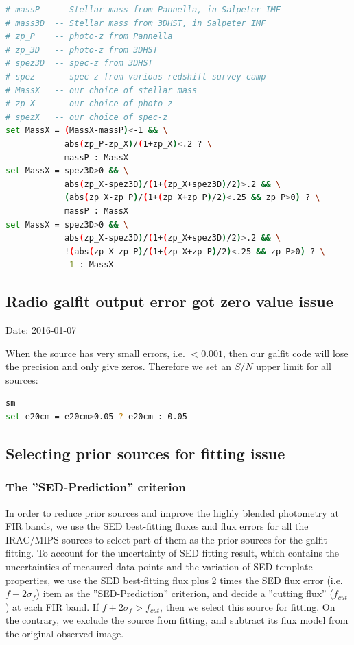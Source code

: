 \documentclass[11pt,a4paper]{article}
\begin{document}
\begin{lstlisting}[language=bash]
# massP   -- Stellar mass from Pannella, in Salpeter IMF
# mass3D  -- Stellar mass from 3DHST, in Salpeter IMF
# zp_P    -- photo-z from Pannella
# zp_3D   -- photo-z from 3DHST
# spez3D  -- spec-z from 3DHST
# spez    -- spec-z from various redshift survey camp
# MassX   -- our choice of stellar mass
# zp_X    -- our choice of photo-z
# spezX   -- our choice of spec-z
set MassX = (MassX-massP)<-1 && \
            abs(zp_P-zp_X)/(1+zp_X)<.2 ? \
            massP : MassX 
set MassX = spez3D>0 && \
            abs(zp_X-spez3D)/(1+(zp_X+spez3D)/2)>.2 && \
            (abs(zp_X-zp_P)/(1+(zp_X+zp_P)/2)<.25 && zp_P>0) ? \
            massP : MassX
set MassX = spez3D>0 && \
            abs(zp_X-spez3D)/(1+(zp_X+spez3D)/2)>.2 && \
            !(abs(zp_X-zp_P)/(1+(zp_X+zp_P)/2)<.25 && zp_P>0) ? \
            -1 : MassX
\end{lstlisting}


\subsection{Radio galfit output error got zero value issue}

\textcolor{green!90!black!60!orange}{Date: 2016-01-07}

When the source has very small errors, i.e. $<0.001$, then our galfit code will lose the precision and only give zeros. Therefore we set an $S/N$ upper limit for all sources:

\begin{lstlisting}[language=bash]
sm
set e20cm = e20cm>0.05 ? e20cm : 0.05
\end{lstlisting}


\subsection{Selecting prior sources for fitting issue}

\subsubsection{The ''SED-Prediction'' criterion}

In order to reduce prior sources and improve the highly blended photometry at FIR bands, we use the SED best-fitting fluxes and flux errors for all the IRAC/MIPS sources to select part of them as the prior sources for the galfit fitting. To account for the uncertainty of SED fitting result, which contains the uncertainties of measured data points and the variation of SED template properties, we use the SED best-fitting flux plus 2 times the SED flux error (i.e. $f+2{\sigma}_{f}$) item as the ''SED-Prediction'' criterion, and decide a ''cutting flux'' ($f_{cut}$) at each FIR band. If $f+2{\sigma}_{f}>f_{cut}$, then we select this source for fitting. On the contrary, we exclude the source from fitting, and subtract its flux model from the original observed image. 
\end{document}
